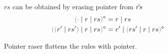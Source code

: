 
\begin{figure}[ht]

        {$rs$ can be obtained by erasing pointer from $\hat{rs}$}
\begin{align*}
  \rmpointer{\zruls{\cdot}{r}{rs}} &= \hrules{r}{rs} \\
  \rmpointer{\zruls{\hrulesP{r'}{rs'}}{r}{rs}} &= \hrules{r'}{\rmpointer{\zruls{rs'}{r}{rs}}}
\end{align*}

\caption{Pointer raser flattens the rules with pointer.}
\label{fig:pointer-eraser}
\end{figure}
